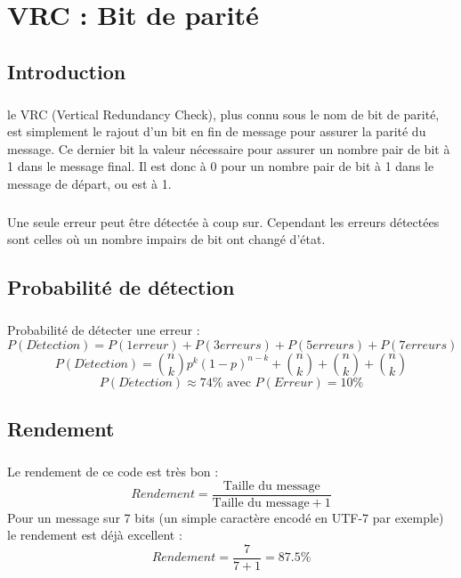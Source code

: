 
\chapter{VRC : Bit de parité}

    \section{Introduction}

        \paragraph{}
le VRC (Vertical Redundancy Check), plus connu sous le nom de bit de parité,
est simplement le rajout d'un bit en fin de message pour assurer la parité du message.
Ce dernier bit la valeur nécessaire pour assurer un nombre pair de bit à 1 dans le message final.
Il est donc à 0 pour un nombre pair de bit à 1 dans le message de départ, ou est à 1.
        \paragraph{}
Une seule erreur peut être détectée à coup sur.
Cependant les erreurs détectées sont celles où un nombre impairs de bit ont changé d'état.


    \section{Probabilité de détection}

        \paragraph{}
Probabilité de détecter une erreur :
\[  P(D\acute{e}tection) = P(1 erreur) + P(3 erreurs) + P(5 erreurs) + P(7 erreurs) \]
\[  P(D\acute{e}tection) = {n\choose k}p^k(1-p)^{n-k} + {n\choose k} + {n\choose k} + {n\choose k} \]
\[  P(D\acute{e}tection) \approx 74\% \text{ avec } P( Erreur ) = 10\% \]


    \section{Rendement}

        \paragraph{}
Le rendement de ce code est très bon :
\[  Rendement = \frac{\text{Taille du message}}{\text{Taille du message}+1} \]
Pour un message sur 7 bits (un simple caractère encodé en UTF-7 par exemple) le rendement est déjà excellent :
\[  Rendement = \frac{7}{7+1} = 87.5\% \]
